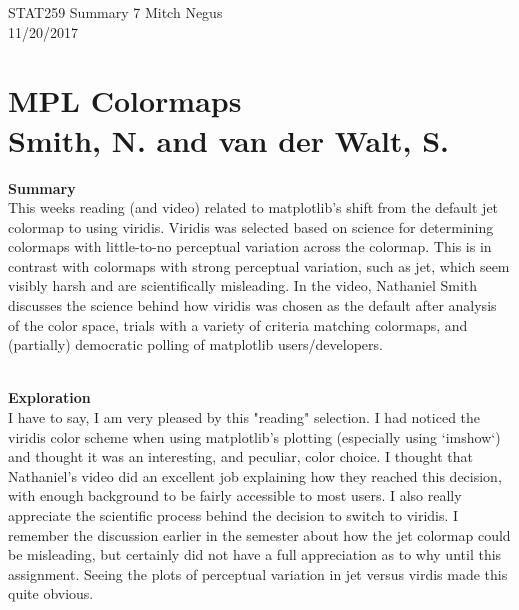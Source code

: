 \documentclass{report}
\newcommand{\tab}{\-\hspace{1cm}}
\begin{document}
\thispagestyle{empty}
\sffamily

\large {STAT259 Summary {7} \hfill Mitch Negus\\
		\hspace*{\fill} 11/20/2017\\ }
\section*{\textsf{MPL Colormaps \\ \normalsize Smith, N. and van der Walt, S.}}

\textbf{Summary}\\
\tab This weeks reading (and video) related to matplotlib's shift from the default jet colormap to using viridis. Viridis was selected based on science for determining colormaps with little-to-no perceptual variation across the colormap. This is in contrast with colormaps with strong perceptual variation, such as jet, which seem visibly harsh and are scientifically misleading. In the video, Nathaniel Smith discusses the science behind how viridis was chosen as the default after analysis of the color space, trials with a variety of criteria matching colormaps, and (partially) democratic polling of matplotlib users/developers.

\-\\
\textbf{Exploration}\\
\tab I have to say, I am very pleased by this "reading" selection. I had noticed the viridis color scheme when using matplotlib's plotting (especially using `imshow`) and thought it was an interesting, and peculiar, color choice. I thought that Nathaniel's video did an excellent job explaining how they reached this decision, with enough background to be fairly accessible to most users. I also really appreciate the scientific process behind the decision to switch to viridis. I remember the discussion earlier in the semester about how the jet colormap could be misleading, but certainly did not have a full appreciation as to why until this assignment. Seeing the plots of perceptual variation in jet versus virdis made this quite obvious. 
\end{document}
